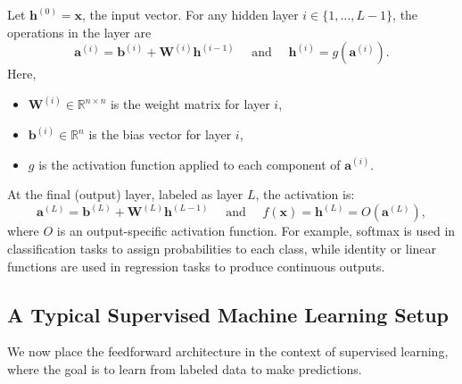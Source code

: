 Let \( \mathbf{h}^{(0)} = \mathbf{x} \), the input vector. For any hidden layer \( i \in \{1, \ldots, L - 1\} \), the operations in the layer are
\[
\mathbf{a}^{(i)} = \mathbf{b}^{(i)} + \mathbf{W}^{(i)} \mathbf{h}^{(i-1)} \quad \text{ and } \quad \mathbf{h}^{(i)} = g(\mathbf{a}^{(i)}).
\]
Here,
\vspace{-5pt}
\begin{itemize}
    \item \( \mathbf{W}^{(i)} \in \mathbb{R}^{n \times n} \) is the weight matrix for layer \( i \),
    \item \( \mathbf{b}^{(i)} \in \mathbb{R}^{n} \) is the bias vector for layer \( i \),
    \item \( g \) is the activation function applied to each component of \( \mathbf{a}^{(i)} \).
\end{itemize}

At the final (output) layer, labeled as layer \( L \), the activation is:
\[
\mathbf{a}^{(L)} = \mathbf{b}^{(L)} + \mathbf{W}^{(L)} \mathbf{h}^{(L-1)} \quad \text{ and } \quad f(\mathbf{x}) = \mathbf{h}^{(L)} = O(\mathbf{a}^{(L)}),
\]
where \( O \) is an output-specific activation function. For example, softmax is used in classification tasks to assign probabilities to each class, while identity or linear functions are used in regression tasks to produce continuous outputs.

\subsection{A Typical Supervised Machine Learning Setup}

We now place the feedforward architecture in the context of supervised learning, where the goal is to learn from labeled data to make predictions.


